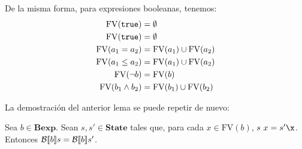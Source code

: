 De la misma forma, para expresiones booleanas, tenemos:
\begin{align*}
    \mathrm{FV}(\texttt{true}) & = \emptyset\\
    \mathrm{FV}(\texttt{true}) & = \emptyset\\
    \mathrm{FV}(a_1 = a_2) & = \mathrm{FV}(a_1) \cup \mathrm{FV}(a_2) \\
    \mathrm{FV}(a_1 \leq a_2) & = \mathrm{FV}(a_1) \cup \mathrm{FV}(a_2) \\
    \mathrm{FV}(\neg b) & = \mathrm{FV}(b)\\
    \mathrm{FV}(b_1 \land b_2) & = \mathrm{FV}(b_1) \cup \mathrm{FV}(b_2) 
\end{align*}

La demostración del anterior lema se puede repetir de nuevo:

\begin{lema}
Sea $b\in \mathbf{Bexp}$. Sean $s, s' \in \mathbf{State}$ tales que, para cada $x \in \mathrm{FV}(b)$, $s\ x = s'\x$. Entonces $\mathcal{B}[\![b]\!]s = \mathcal{B}[\![b]\!]s'$.
\end{lema}

